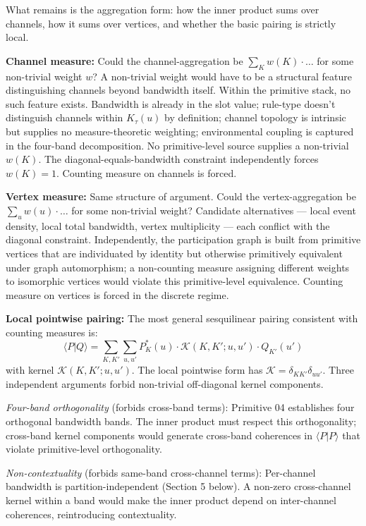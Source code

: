 \documentclass[11pt,a4paper]{article}
\begin{document}
What remains is the aggregation form: how the inner product sums over channels, how it sums over vertices, and whether the basic pairing is strictly local.

\textbf{Channel measure:} Could the channel-aggregation be $\sum_K w(K)\cdot\ldots$ for some non-trivial weight $w$? A non-trivial weight would have to be a structural feature distinguishing channels beyond bandwidth itself. Within the primitive stack, no such feature exists. Bandwidth is already in the slot value; rule-type doesn't distinguish channels within $K_\tau(u)$ by definition; channel topology is intrinsic but supplies no measure-theoretic weighting; environmental coupling is captured in the four-band decomposition. No primitive-level source supplies a non-trivial $w(K)$. The diagonal-equals-bandwidth constraint independently forces $w(K) = 1$. Counting measure on channels is forced.

\textbf{Vertex measure:} Same structure of argument. Could the vertex-aggregation be $\sum_u w(u)\cdot\ldots$ for some non-trivial weight? Candidate alternatives --- local event density, local total bandwidth, vertex multiplicity --- each conflict with the diagonal constraint. Independently, the participation graph is built from primitive vertices that are individuated by identity but otherwise primitively equivalent under graph automorphism; a non-counting measure assigning different weights to isomorphic vertices would violate this primitive-level equivalence. Counting measure on vertices is forced in the discrete regime.

\textbf{Local pointwise pairing:} The most general sesquilinear pairing consistent with counting measures is:
\[
\langle P|Q\rangle = \sum_{K,K'} \sum_{u,u'} P^*_K(u) \cdot \mathcal{K}(K, K'; u, u') \cdot Q_{K'}(u')
\]
with kernel $\mathcal{K}(K, K'; u, u')$. The local pointwise form has $\mathcal{K} = \delta_{KK'}\delta_{uu'}$. Three independent arguments forbid non-trivial off-diagonal kernel components.

\emph{Four-band orthogonality} (forbids cross-band terms): Primitive 04 establishes four orthogonal bandwidth bands. The inner product must respect this orthogonality; cross-band kernel components would generate cross-band coherences in $\langle P|P\rangle$ that violate primitive-level orthogonality.

\emph{Non-contextuality} (forbids same-band cross-channel terms): Per-channel bandwidth is partition-independent (Section 5 below). A non-zero cross-channel kernel within a band would make the inner product depend on inter-channel coherences, reintroducing contextuality.
\end{document}
